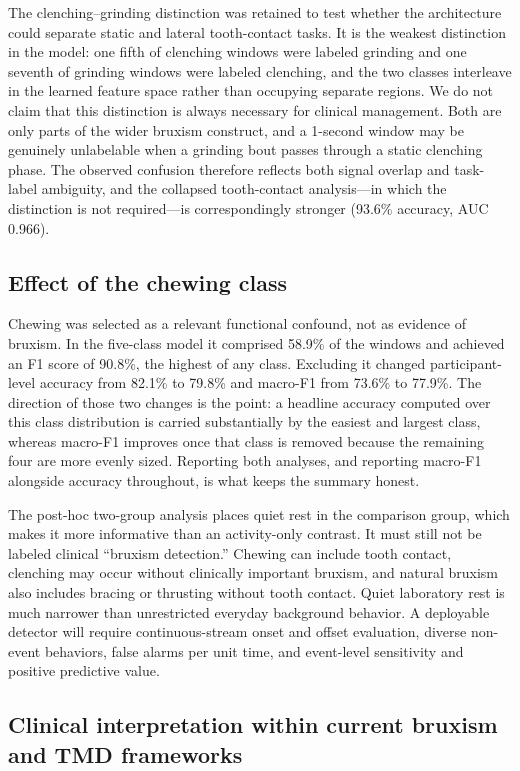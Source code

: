 \documentclass[pdflatex,sn-nature,iicol]{sn-jnl}
\begin{document}
The clenching--grinding distinction was retained to test whether the architecture could separate static and lateral tooth-contact tasks. It is the weakest distinction in the model: one fifth of clenching windows were labeled grinding and one seventh of grinding windows were labeled clenching, and the two classes interleave in the learned feature space rather than occupying separate regions. We do not claim that this distinction is always necessary for clinical management. Both are only parts of the wider bruxism construct, and a 1-second window may be genuinely unlabelable when a grinding bout passes through a static clenching phase. The observed confusion therefore reflects both signal overlap and task-label ambiguity, and the collapsed tooth-contact analysis---in which the distinction is not required---is correspondingly stronger (93.6\% accuracy, AUC 0.966).

\subsection{Effect of the chewing class}

Chewing was selected as a relevant functional confound, not as evidence of bruxism. In the five-class model it comprised 58.9\% of the windows and achieved an F1 score of 90.8\%, the highest of any class. Excluding it changed participant-level accuracy from 82.1\% to 79.8\% and macro-F1 from 73.6\% to 77.9\%. The direction of those two changes is the point: a headline accuracy computed over this class distribution is carried substantially by the easiest and largest class, whereas macro-F1 improves once that class is removed because the remaining four are more evenly sized. Reporting both analyses, and reporting macro-F1 alongside accuracy throughout, is what keeps the summary honest.

The post-hoc two-group analysis places quiet rest in the comparison group, which makes it more informative than an activity-only contrast. It must still not be labeled clinical ``bruxism detection.'' Chewing can include tooth contact, clenching may occur without clinically important bruxism, and natural bruxism also includes bracing or thrusting without tooth contact. Quiet laboratory rest is much narrower than unrestricted everyday background behavior. A deployable detector will require continuous-stream onset and offset evaluation, diverse non-event behaviors, false alarms per unit time, and event-level sensitivity and positive predictive value.

\subsection{Clinical interpretation within current bruxism and TMD frameworks}
\end{document}

